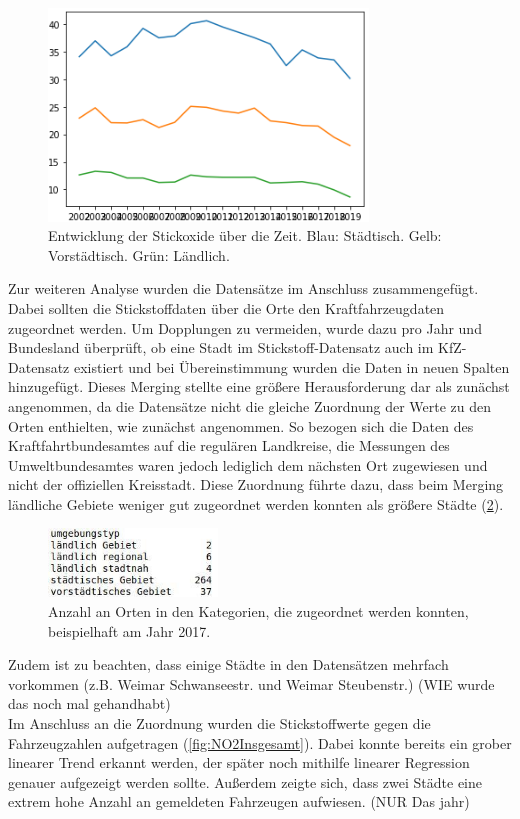 \documentclass[11pt,a4paper,oneside,german]{article}
\begin{document}
\begin{figure}[h!]
	\centering
	\includegraphics[width=8.5cm]{NO2Entwicklung.png}
	\caption{Entwicklung der Stickoxide über die Zeit. Blau: Städtisch. Gelb: Vorstädtisch. Grün: Ländlich.}
	\label{fig:NO2Entwicklung}
\end{figure}

Zur weiteren Analyse wurden die Datensätze im Anschluss zusammengefügt. Dabei sollten die Stickstoffdaten über die Orte den Kraftfahrzeugdaten zugeordnet werden. Um Dopplungen zu vermeiden, wurde dazu pro Jahr und Bundesland überprüft, ob eine Stadt im Stickstoff-Datensatz auch im KfZ-Datensatz existiert und bei Übereinstimmung wurden die Daten in neuen Spalten hinzugefügt. Dieses Merging stellte eine größere Herausforderung dar als zunächst angenommen, da die Datensätze nicht die gleiche Zuordnung der Werte zu den Orten enthielten, wie zunächst angenommen. So bezogen sich die Daten des Kraftfahrtbundesamtes auf die regulären Landkreise, die Messungen des Umweltbundesamtes waren jedoch lediglich dem nächsten Ort zugewiesen und nicht der offiziellen Kreisstadt. Diese Zuordnung führte dazu, dass beim Merging ländliche Gebiete weniger gut zugeordnet werden konnten als größere Städte (\ref{fig:Kategorien}).\\

\begin{figure}[h!]
	\centering
	\includegraphics[width=4.5cm]{Kategorien.jpg}
	\caption{Anzahl an Orten in den Kategorien, die zugeordnet werden konnten, beispielhaft am Jahr 2017.}
	\label{fig:Kategorien}
\end{figure}

Zudem ist zu beachten, dass einige Städte in den Datensätzen mehrfach vorkommen (z.B. Weimar Schwanseestr. und Weimar Steubenstr.) (WIE wurde das noch mal gehandhabt) \\
Im Anschluss an die Zuordnung wurden die Stickstoffwerte gegen die Fahrzeugzahlen aufgetragen (\ref{fig:NO2Insgesamt}). Dabei konnte bereits ein grober linearer Trend erkannt werden, der später noch mithilfe linearer Regression genauer aufgezeigt werden sollte. Außerdem zeigte sich, dass zwei Städte eine extrem hohe Anzahl an gemeldeten Fahrzeugen aufwiesen. (NUR Das jahr)
\end{document}
